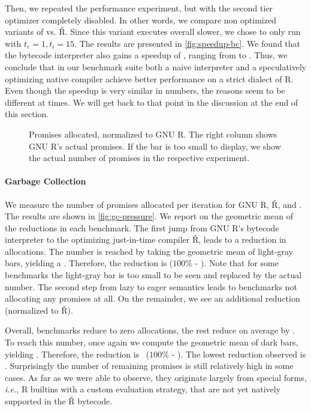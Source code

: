 \documentclass[review,creen,acmsmall]{acmart}
\renewcommand{\Rsh}{{\sf\v R}\xspace}
\newcommand{\ie}{\emph{i.e.},\xspace}
\begin{document}
Then, we repeated the performance experiment, but with the second tier optimizer
completely disabled. In other words, we compare non optimized variants of
\rshstrict vs. \Rsh. Since this variant executes overall \rshBCSlowdown slower,
we chose to only run with $t_e = 1, t_i = 15$. The results are presented in
\autoref{fig:speedup-bc}. We found that the bytecode interpreter also gains a
speedup of \speedupBCRshStrict, ranging from \speedupBCRshStrictMin to
\speedupBCRshStrictMax.
%
Thus, we conclude that in our benchmark suite both a naive interpreter and a
speculatively optimizing native compiler achieve better performance on a strict
dialect of R. Even though the speedup is very similar in numbers, the reasons
seem to be different at times. We will get back to that point in the discussion
at the end of this section.


\begin{figure}[h]
  \centering
  
  \caption{Promises allocated, normalized to GNU R. The right column shows GNU R's actual promises. If the bar is too small to display, we show the actual number of promises in the respective experiment.}
  \label{fig:gc-pressure}
\end{figure}

\paragraph{Garbage Collection}
We measure the number of promises allocated per iteration for GNU R, \Rsh, and
\rshstrict. The results are shown in \autoref{fig:gc-pressure}. We report on the
geometric mean of the reductions in each benchmark. The first jump from GNU R's
bytecode interpreter to the optimizing just-in-time compiler \Rsh, leads to a
\promiseAlocationReductionGnurRsh reduction in allocations. The number is
reached by taking the geometric mean of light-gray bars, yielding a
\promiseAllocationGnurRsh. Therefore, the reduction is
\promiseAlocationReductionGnurRsh ({$100\%$\xspace} -
\promiseAllocationGnurRsh). Note that for some benchmarks the light-gray bar is
too small to be seen and replaced by the actual number. The second step from
lazy to eager semantics leads to \promiseAlocationReductionRshStrictToZero
benchmarks not allocating any promises at all. On the remainder, we see an
additional \promiseAlocationReductionRshStrict reduction (\rshstrict normalized
to \Rsh).

Overall, \promiseAlocationReductionRshStrictToZero benchmarks reduce to zero
allocations, the rest reduce on average by
\promiseAlocationReductionGnurRshStrict. To reach this number, once again we
compute the geometric mean of dark bars, yielding
\promiseAllocatioGnurRshStrict. Therefore, the reduction is
~\promiseAlocationReductionGnurRshStrict ({$100\%$\xspace} -
\promiseAllocatioGnurRshStrict).
The lowest reduction observed is \promiseAlocationReductionGnurRshStrictMin.
Surprisingly the number of remaining promises is still relatively high in some
cases. As far as we were able to observe, they originate largely from special
forms, \ie R builtins with a custom evaluation strategy, that are not yet
natively supported in the \Rsh bytecode.
\end{document}

